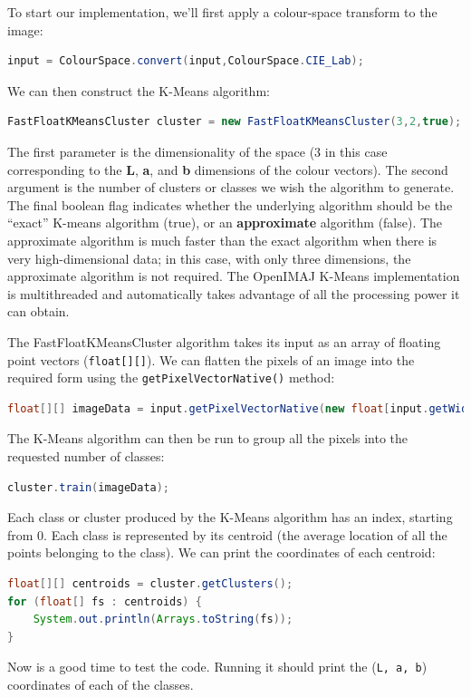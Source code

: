 \documentclass[10pt,a4paper,twoside,extrafontsizes]{memoir}
\begin{document}
\pagebreak
To start our implementation, we'll first apply a colour-space transform to the image:
\begin{lstlisting}[language=java]
input = ColourSpace.convert(input,ColourSpace.CIE_Lab);
\end{lstlisting}
We can then construct the K-Means algorithm:
\begin{lstlisting}[language=java]
FastFloatKMeansCluster cluster = new FastFloatKMeansCluster(3,2,true);
\end{lstlisting}
The first parameter is the dimensionality of the space (3 in this case corresponding 
to the \textbf{L}, \textbf{a}, and \textbf{b} dimensions of the colour vectors). The second 
argument is the number of clusters or classes we wish the algorithm to generate. The final 
boolean flag indicates whether the underlying algorithm should be the ``exact'' K-means algorithm (true), or an 
\textbf{approximate} algorithm (false). The approximate algorithm is much faster than the exact 
algorithm when there is very high-dimensional data; in this case, with only three dimensions, 
the approximate algorithm is not required. The OpenIMAJ K-Means implementation is 
multithreaded and automatically takes advantage of all the processing power it can obtain.

The FastFloatKMeansCluster algorithm takes its input as an array of floating point vectors
(\verb+float[][]+). We can flatten the pixels of an image into the required form using the 
\verb+getPixelVectorNative()+ method:
\begin{lstlisting}[language=java]
float[][] imageData = input.getPixelVectorNative(new float[input.getWidth() * input.getHeight()][3]);
\end{lstlisting}
The K-Means algorithm can then be run to group all the pixels into the requested number of classes:
\begin{lstlisting}[language=java]
cluster.train(imageData);
\end{lstlisting}
Each class or cluster produced by the K-Means algorithm has an index, starting from 0. Each class is 
represented by its centroid (the average location of all the points belonging to the class). We can 
print the coordinates of each centroid:
\begin{lstlisting}[language=java]
float[][] centroids = cluster.getClusters();
for (float[] fs : centroids) {
    System.out.println(Arrays.toString(fs));
}
\end{lstlisting}
Now is a good time to test the code. Running it should print the (\verb+L, a, b+) coordinates of each 
of the classes.
\end{document}
